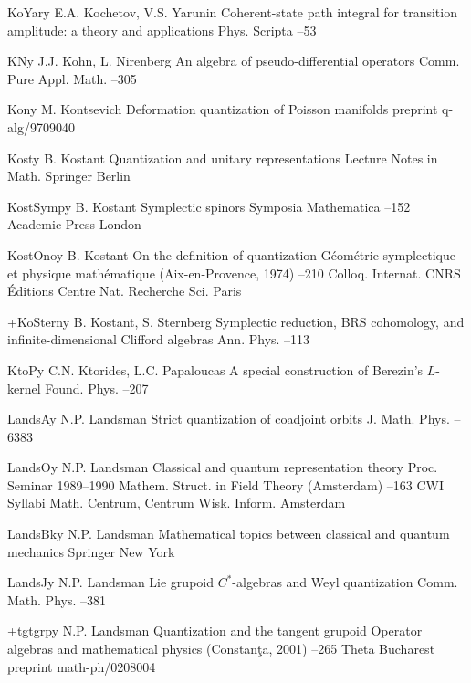 \documentclass[12pt]{amsart}
\numberwithin{equation}{section}
\theoremstyle{remark}
\newcommand{\by}{\mathbf y}
\begin{document}
\begin{thebibliography}{199}
 KoYar\by{ E.A. Kochetov, V.S. Yarunin \paper Coherent-state path integral
for transition amplitude: a theory and applications \jour Phys. Scripta 
 --53}

 KN\by{ J.J. Kohn, L. Nirenberg \paper An algebra of pseudo-differential
operators \jour Comm. Pure Appl. Math.   --305}

 Kon\by{ M. Kontsevich \paper Deformation quantization of Poisson
manifolds \jour preprint q-alg/9709040 }

 Kost\by{ B. Kostant \paper Quantization and unitary representations
\inbook Lecture Notes in Math.   \publ Springer \publaddr Berlin
}

 KostSymp\by{ B. Kostant \paper Symplectic spinors \inbook Symposia
Mathematica  --152 \publ Academic Press \publaddr London
}

 KostOno\by{ B. Kostant \paper On the definition of quantization \inbook
G\'eom\'etrie symplectique et physique math\'ematique (Aix-en-Provence, 1974)
--210 \bookinfo Colloq. Internat. CNRS  \publ \'Editions
Centre Nat. Recherche Sci. \publaddr Paris }

 +KoStern\by{ B. Kostant, S. Sternberg \paper Symplectic reduction,
BRS cohomology, and infinite-dimensional Clifford algebras \jour Ann. Phys.
  --113}

 KtoP\by{ C.N. Ktorides, L.C. Papaloucas \paper A special construction of
Berezin's $L$-kernel \jour Found. Phys.   --207}

 LandsA\by{ N.P. Landsman \paper Strict quantization of coadjoint orbits
\jour J. Math. Phys.   --6383}

 LandsO\by{ N.P. Landsman \paper Classical and quantum representation
theory \inbook Proc. Seminar 1989--1990 Mathem. Struct. in Field Theory
(Amsterdam) --163 \bookinfo CWI Syllabi  \publ Math. Centrum,
Centrum Wisk. Inform. Amsterdam }

 LandsBk\by{ N.P. Landsman \book Mathematical topics between classical and
quantum mechanics \publ Springer \publaddr New York }

 LandsJ\by{ N.P. Landsman \paper Lie grupoid $C^*$-algebras and Weyl
quantization \jour Comm. Math. Phys.   --381}

 +tgtgrp\by{ N.P. Landsman \paper Quantization and the tangent grupoid
\inbook Operator algebras and mathematical physics (Constan\c{t}a, 2001)
--265 \publ Theta \publaddr Bucharest  \paperinfo preprint
math-ph/0208004}


\end{thebibliography}
\end{document}
